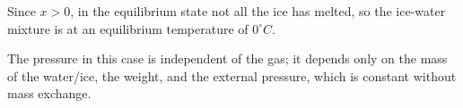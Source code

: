 Since \( x > 0 \), in the equilibrium state not all the ice has melted, so the ice-water mixture is at an equilibrium temperature of \( 0^\circ C \).

The pressure in this case is independent of the gas; it depends only on the mass of the water/ice, the weight, and the external pressure, which is constant without mass exchange.